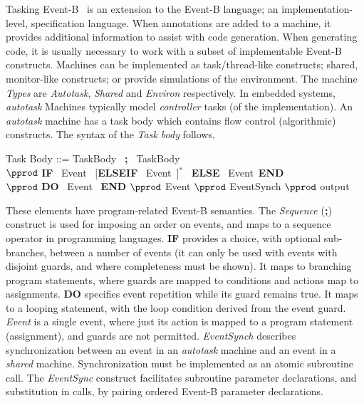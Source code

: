 \documentclass{llncs}%
\begin{document}
Tasking Event-B~\cite{ae2011a} is an extension to the Event-B language; an implementation-level, specification language. When annotations are added to a machine, it provides additional information to assist with code generation. When generating code, it is usually necessary to work with a subset of implementable Event-B constructs.  Machines can be implemented as task/thread-like constructs; shared, monitor-like constructs; or provide simulations of the environment.  The machine \emph{Types} are \emph{Autotask}, \emph{Shared} and \emph{Environ} respectively.  In embedded systems, \emph{autotask} Machines typically model \emph{controller} tasks (of the implementation). An \emph{autotask} machine has a task body which contains flow control (algorithmic) constructs. The syntax of the \emph{Task body} follows,
%
%
\begin{center}
\begin{minipage}{0.8\textwidth}
Task Body ::= TaskBody~ \textbf{;}~ TaskBody\\
\hspace*{1cm}$\pprod$ \textbf{IF}~ Event~ [\textbf{ELSEIF}~ Event~]$^*$~ \textbf{ELSE}~ Event~\textbf{END} \\
\hspace*{1cm}$\pprod$ \textbf{DO}~ Event~ \textbf{END} $\pprod$ Event $\pprod$ EventSynch $\pprod$ output 
\end{minipage}
\end{center}
%
\noindent These elements have program-related Event-B semantics. The \emph{Sequence} (\textbf{;}) construct is used for imposing an order on events, and maps to a sequence operator in programming languages. \textbf{IF} provides a choice, with optional sub-branches, between a number of events (it can only be used with events with disjoint guards, and where completeness must be shown). It maps to branching program statements, where guards are mapped to conditions and actions map to assignments. \textbf{DO} specifies event repetition while its guard remains true. It maps to a looping statement, with the loop condition derived from the event guard. \emph{Event} is a single event, where just its action is mapped to a program statement (assignment), and guards are not permitted. \emph{EventSynch} describes synchronization between an event in an \emph{autotask} machine and an event in a \emph{shared} machine. Synchronization must be implemented as an atomic subroutine call. The \emph{EventSync} construct facilitates subroutine parameter declarations, and substitution in calls, by pairing ordered Event-B parameter declarations. 
\end{document}

